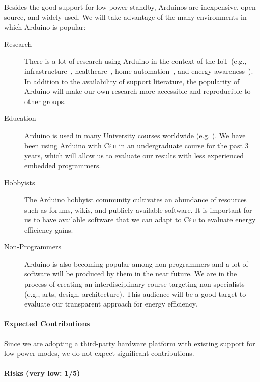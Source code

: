 \documentclass[12pt,english]{amsart}
\newcommand{\CEU}{\textsc{C\'{e}u}\xspace}
\begin{document}
Besides the good support for low-power standby, Arduinos are inexpensive,
open source, and widely used.
%
We will take advantage of the many environments in which Arduino is popular:
%
\begin{description}
\item[Research]
    There is a lot of research using Arduino in the context of the IoT (e.g.,
    infrastructure~\cite{arduino.infra}, healthcare~\cite{arduino.health},
    home automation~\cite{arduino.home}, and energy
    awareness~\cite{arduino.energy}).
    In addition to the availability of support literature, the popularity of
    Arduino will make our own research more accessible and reproducible to
    other groups.
\item[Education]
    Arduino is used in many University courses worldwide
    (e.g. \cite{arduino.edu.1,arduino.edu.2,arduino.edu.3,arduino.edu.4}).
    We have been using Arduino with \CEU in an undergraduate course for the
    past 3 years, which will
    allow us to evaluate
    our results with less experienced embedded programmers.
\item[Hobbyists]
    The Arduino hobbyist community cultivates an abundance of resources such as
    forums, wikis, and publicly available software.
    It is important for us to have available software that we can adapt to \CEU
    to evaluate energy efficiency gains.
\item[Non-Programmers]
    Arduino is also becoming popular among non-programmers and a lot of
    software will be produced by them in the near future.
    We are in the process of creating an interdisciplinary course targeting
    non-specialists (e.g., arts, design, architecture).
    This audience will be a good target to evaluate our transparent approach for
    energy efficiency.
\end{description}


\paragraph{\textbf{Expected Contributions}} %

Since we are adopting a third-party hardware platform with existing support for
low power modes, we do not expect significant contributions.

\paragraph{\textbf{Risks (very low: 1/5)}}
\end{document}
